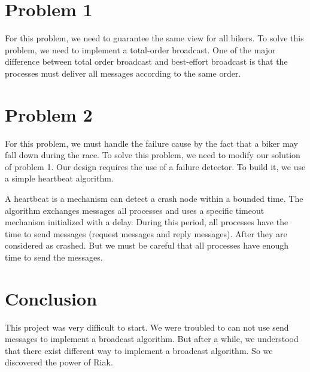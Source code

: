 \documentclass{article}
\begin{document}
\section*{Problem 1}
For this problem, we need to guarantee the same view for all bikers. To solve this problem, we need to implement a total-order broadcast.
One of the major difference between total order broadcast and best-effort broadcast is that the processes must deliver all messages according to
the same order.




\section*{Problem 2}
For this problem, we must handle the failure cause by the fact that a biker may fall down during the race.
To solve this problem, we need to modify our solution of problem 1. Our design requires the use of a 
failure detector. To build it, we use a simple heartbeat algorithm.\newline

A heartbeat is a mechanism can detect a crash node within a bounded time. The algorithm exchanges 
messages all processes and uses a specific timeout mechanism initialized with a delay. During this period,
all processes have the time to send messages (request messages and reply messages). After they are considered 
as crashed. But we must be careful that all processes have enough time to send the messages. 


\section*{Conclusion}
This project was very difficult to start. We were troubled to can not use send messages to implement a broadcast algorithm.
But after a while, we understood that there exist different way to implement a broadcast algorithm. So we discovered the power
of Riak.
\end{document}
